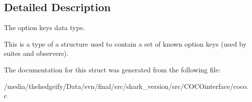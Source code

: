 \subsection{Detailed Description}
The option keys data type. 

This is a type of a structure used to contain a set of known option keys (used by suites and observers). 

The documentation for this struct was generated from the following file\+:\begin{DoxyCompactItemize}
\item 
/media/thehedgeify/\+Data/svn/final/src/shark\+\_\+version/src/\+C\+O\+C\+Ointerface/coco.\+c\end{DoxyCompactItemize}
